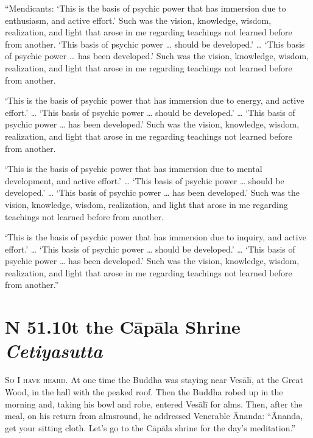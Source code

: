 \documentclass[12pt,openany]{book}%
\newcommand*{\suttatitleacronym}[1]{\smaller[2]{#1}\vspace*{.3em}}
\newcommand*{\suttatitletranslation}[1]{\linebreak{#1}}
\newcommand*{\suttatitleroot}[1]{\linebreak\smaller[2]\itshape{#1}}
\newcommand*{\tocacronym}[1]{\hspace*{-3.3em}{#1}\quad}
\newcommand*{\toctranslation}[1]{#1}
\newcommand*{\tocroot}[1]{(\textit{#1})}
\newcommand*{\scevam}[1]{\textsc{#1}}
\begin{document}
“Mendicants: ‘This is the basis of psychic power that has immersion due to enthusiasm, and active effort.’ Such was the vision, knowledge, wisdom, realization, and light that arose in me regarding teachings not learned before from another. ‘This basis of psychic power … should be developed.’ … ‘This basis of psychic power … has been developed.’ Such was the vision, knowledge, wisdom, realization, and light that arose in me regarding teachings not learned before from another. 

‘This is the basis of psychic power that has immersion due to energy, and active effort.’ … ‘This basis of psychic power … should be developed.’ … ‘This basis of psychic power … has been developed.’ Such was the vision, knowledge, wisdom, realization, and light that arose in me regarding teachings not learned before from another. 

‘This is the basis of psychic power that has immersion due to mental development, and active effort.’ … ‘This basis of psychic power … should be developed.’ … ‘This basis of psychic power … has been developed.’ Such was the vision, knowledge, wisdom, realization, and light that arose in me regarding teachings not learned before from another. 

‘This is the basis of psychic power that has immersion due to inquiry, and active effort.’ … ‘This basis of psychic power … should be developed.’ … ‘This basis of psychic power … has been developed.’ Such was the vision, knowledge, wisdom, realization, and light that arose in me regarding teachings not learned before from another.” 

%
\section*{{\suttatitleacronym SN 51.10}{\suttatitletranslation At the Cāpāla Shrine }{\suttatitleroot Cetiyasutta}}
\addcontentsline{toc}{section}{\tocacronym{SN 51.10} \toctranslation{At the Cāpāla Shrine } \tocroot{Cetiyasutta}}

\scevam{So I have heard. }At one time the Buddha was staying near \textsanskrit{Vesālī}, at the Great Wood, in the hall with the peaked roof. Then the Buddha robed up in the morning and, taking his bowl and robe, entered \textsanskrit{Vesālī} for alms. Then, after the meal, on his return from almsround, he addressed Venerable Ānanda: “Ānanda, get your sitting cloth. Let’s go to the \textsanskrit{Cāpāla} shrine for the day’s meditation.” 
\end{document}
